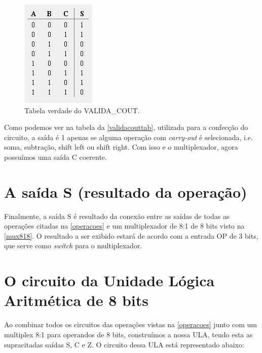\documentclass[
	12pt,				%
	openright,			%
	twoside,			%
	a4paper,			%
	english,			%
	french,				%
	spanish,			%
	brazil,				%
	]{abntex2}
\begin{document}
\begin{figure}[H]
	\begin{center}
	    \includegraphics[scale=0.8]{validacouttab.png}
	\end{center}
\caption{\label{validacouttab}Tabela verdade do VALIDA\_COUT.}
\end{figure}

Como podemos ver na tabela da \autoref{validacouttab}, utilizada para a confecção do circuito, a saída é 1 apenas se alguma operação com \textit{carry-out} é selecionada, i.e. soma, subtração, shift left ou shift right. Com isso e o multiplexador, agora possuímos uma saída C coerente.

\section{A saída S (resultado da operação)}
Finalmente, a saída S é resultado da conexão entre as saídas de todas as operações citadas na \autoref{operacoes} e um multiplexador de 8:1 de 8 bits visto na \autoref{mux818}. O resultado a ser exibido estará de acordo com a entrada OP de 3 bits, que serve como \textit{switch} para o multiplexador. 

\section{O circuito da Unidade Lógica Aritmética de 8 bits}

Ao combinar todos os circuitos das operações vistas na \autoref{operacoes} junto com um multiplex 8:1 para operandos de 8 bits, construímos a nossa ULA, tendo esta as supracitadas saídas S, C e Z. O circuito dessa ULA está representado abaixo:
\end{document}

